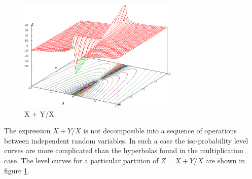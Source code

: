 \begin{figure}
  \centering
  \includegraphics[width=3in]{Images/XpY_X.eps}
  \caption[X + Y/X]
          {X + Y/X}
  \label{fig:XpY_X}
\end{figure}

The expression $X+Y/X$ is not decomposible into a sequence of operations between independent random variables. In such a case the iso-probability level curves are more complicated than the hyperbolas found in the multiplication case. The level curves for a particular partition of $Z = X+Y/X$ are shown in figure \ref{fig:XpY_X}.

